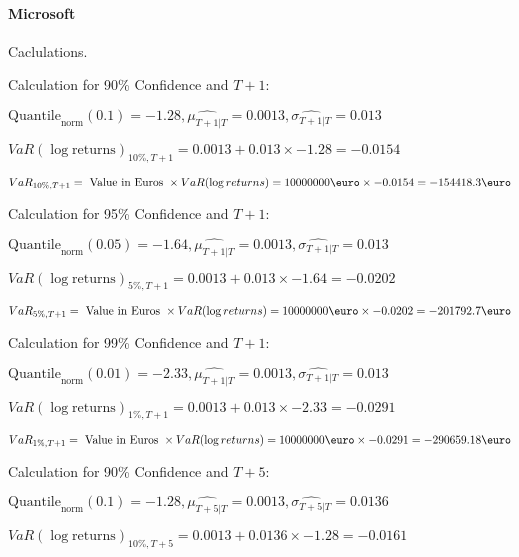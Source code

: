 \paragraph{Microsoft} Caclulations.\newline \indent 




Calculation for 90\% Confidence and $T+1$:

\indent\indent $\text{Quantile}_\text{norm}(0.1) = -1.28,\hat{\mu_{T+1|T}} = 0.0013, \hat{\sigma_{T+1|T}} = 0.013$

\indent\indent $VaR(\log \text{returns})_{10\%, T + 1} = 0.0013 + 0.013\times-1.28 = -0.0154$

\indent\indent $VaR_{10\%, T + 1} = \text{ Value in Euros } \times VaR(\log returns) = 10 000 000 \text{\euro} \times-0.0154 = -154418.3 \text{\euro}$\newline




Calculation for 95\% Confidence and $T+1$:

\indent\indent $\text{Quantile}_\text{norm}(0.05) = -1.64,\hat{\mu_{T+1|T}} = 0.0013, \hat{\sigma_{T+1|T}} = 0.013$

\indent\indent $VaR(\log \text{returns})_{5\%, T + 1} = 0.0013 + 0.013\times-1.64 = -0.0202$

\indent\indent $VaR_{5\%, T + 1} = \text{ Value in Euros } \times VaR(\log returns) = 10 000 000 \text{\euro} \times-0.0202 = -201792.7 \text{\euro}$\newline




Calculation for 99\% Confidence and $T+1$:

\indent\indent $\text{Quantile}_\text{norm}(0.01) = -2.33,\hat{\mu_{T+1|T}} = 0.0013, \hat{\sigma_{T+1|T}} = 0.013$

\indent\indent $VaR(\log \text{returns})_{1\%, T + 1} = 0.0013 + 0.013\times-2.33 = -0.0291$

\indent\indent $VaR_{1\%, T + 1} = \text{ Value in Euros } \times VaR(\log returns) = 10 000 000 \text{\euro} \times-0.0291 = -290659.18 \text{\euro}$\newline




Calculation for 90\% Confidence and $T+5$:

\indent\indent $\text{Quantile}_\text{norm}(0.1) = -1.28,\hat{\mu_{T+5|T}} = 0.0013, \hat{\sigma_{T+5|T}} = 0.0136$

\indent\indent $VaR(\log \text{returns})_{10\%, T + 5} = 0.0013 + 0.0136\times-1.28 = -0.0161$

